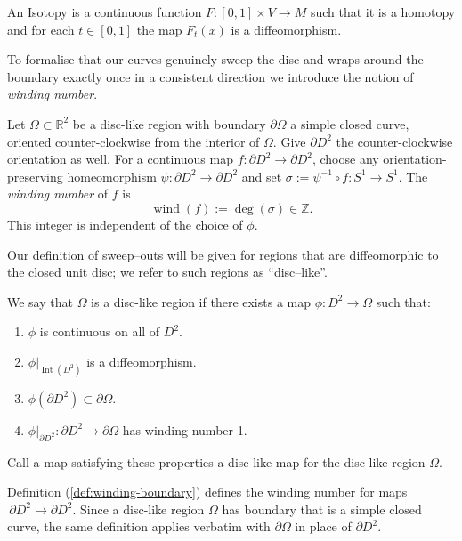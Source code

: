 \begin{definition}
An Isotopy is a continuous function $F: [0,1]\times V \to M$ such that it is a homotopy and for each $t\in [0,1]$ the map $F_t(x)$ is a diffeomorphism.
\end{definition}

\noindent To formalise that our curves genuinely sweep the disc and wraps around the boundary exactly once in a consistent direction we introduce the notion of \emph{winding number}.

\begin{definition}\label{def:winding-boundary}
Let $\Omega\subset\mathbb{R}^2$ be a disc-like region with boundary $\partial\Omega$ a simple closed curve, oriented counter-clockwise from the interior of $\Omega$. Give $\partial D^2$ the counter-clockwise orientation as well.
For a continuous map $f:\partial D^2\to\partial D^2$, choose any orientation-preserving homeomorphism $\psi:\partial D^2\to\partial D^2$ and set $\sigma:=\psi^{-1}\circ f:S^1\to S^1$.  
The \emph{winding number} of $f$ is
\[
\operatorname{wind}(f):=\deg(\sigma)\in\mathbb{Z}.
\]
This integer is independent of the choice of $\phi$.
\end{definition}

\noindent Our definition of sweep–outs will be given for regions that are diffeomorphic to the closed unit disc; we refer to such regions as “disc–like”.
\begin{definition}
We say that $\Omega$ is a disc-like region if there exists a map $\phi:D^2\to \Omega$ such that:
\begin{enumerate}
    \item $\phi$ is continuous on all of $D^2$.
    \item $\phi|_{\operatorname{Int}(D^2)}$ is a diffeomorphism.
    \item $\phi(\partial D^2) \subset \partial \Omega$.
    \item $\phi|_{\partial D^2}: \partial D^2 \to \partial \Omega$ has winding number 1.
\end{enumerate}
Call a map satisfying these properties a disc-like map for the disc-like region $\Omega$.
\end{definition}
\begin{remark}
Definition (\ref{def:winding-boundary}) defines the winding number for maps $\,\partial D^2\to\partial D^2$. Since a disc-like region $\Omega$ has boundary that is a simple closed curve, the same definition applies verbatim with $\partial\Omega$ in place of $\partial D^2$.
\end{remark}

